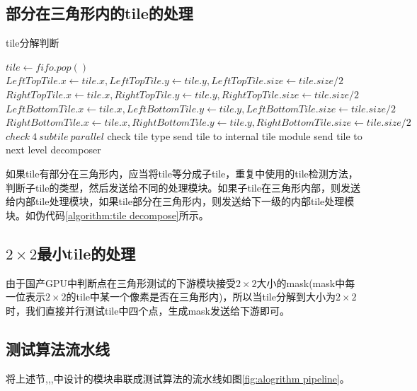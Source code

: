 \subsection{部分在三角形内的tile的处理}
\label{subsection:tile decompose}
\begin{algorithm} [H]
	\caption{tile分解判断} 
	\label{algorithm:tile decompose} 
	\begin{algorithmic}
        \STATE $tile \gets fifo.pop()$
        \STATE $LeftTopTile.x \gets tile.x,LeftTopTile.y \gets tile.y,LeftTopTile.size \gets tile.size/2$
        \STATE $RightTopTile.x \gets tile.x,RightTopTile.y \gets tile.y,RightTopTile.size \gets tile.size/2$
        \STATE $LeftBottomTile.x \gets tile.x,LeftBottomTile.y \gets tile.y,LeftBottomTile.size \gets tile.size/2$
        \STATE $RightBottomTile.x \gets tile.x,RightBottomTile.y \gets tile.y,RightBottomTile.size \gets tile.size/2$
        \STATE $check \ 4 \ subtile \ parallel$
            \STATE check tile type 
                \STATE send tile to internal tile module 
                \STATE send tile to next level decomposer 
            \ENDIF

            
        \ENDFOR
	\end{algorithmic} 
\end{algorithm}
如果tile有部分在三角形内，应当将tile等分成子tile，重复中使用的tile检测方法，判断子tile的类型，然后发送给不同的处理模块。如果子tile在三角形内部，则发送给内部tile处理模块，如果tile部分在三角形内，则发送给下一级的内部tile处理模块。如伪代码\ref{algorithm:tile decompose}所示。



\subsection{$2\times 2$最小tile的处理}
\label{subsection:tile raster}
由于国产GPU中判断点在三角形测试的下游模块接受$2\times 2$大小的mask(mask中每一位表示$2\times 2$的tile中某一个像素是否在三角形内)，所以当tile分解到大小为$2\times 2$时，我们直接并行测试tile中四个点，生成mask发送给下游即可。

\subsection{测试算法流水线}

将上述节,,,中设计的模块串联成测试算法的流水线如图\ref{fig:alogrithm pipeline}。


